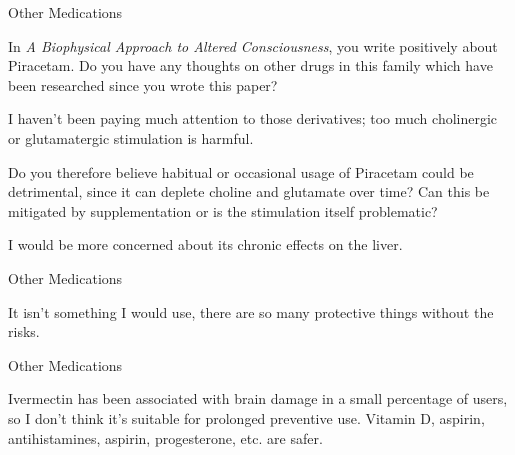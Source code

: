 \documentclass[11pt,oneside,openany,extrafontsizes]{memoir}
\begin{document}
\begin{emailexchange}{Other Medications}

    \begin{question}
        In \textit{A Biophysical Approach to Altered Consciousness}, you write positively about Piracetam. Do you have any thoughts on other drugs in this family which have been researched since you wrote this paper?
    \end{question}

    \begin{answer}
      I haven't been paying much attention to those derivatives; too much cholinergic or glutamatergic stimulation is harmful.
    \end{answer}

    \begin{question}
        Do you therefore believe habitual or occasional usage of Piracetam could be detrimental, since it can deplete choline and glutamate over time? Can this be mitigated by supplementation or is the stimulation itself problematic?
    \end{question}

    \begin{answer}
      I would be more concerned about its chronic effects on the liver.
    \end{answer}
\end{emailexchange}

\begin{standalonequote}{Other Medications}

    \begin{answer}
      It isn't something I would use, there are so many protective things without the risks.
    \end{answer}
\end{standalonequote}

\begin{standalonequote}{Other Medications}

    \begin{answer}
      Ivermectin has been associated with brain damage in a small percentage of users, so I don't think it's suitable for prolonged preventive use. Vitamin D, aspirin, antihistamines, aspirin, progesterone, etc. are safer.
    \end{answer}
\end{standalonequote}
\end{document}
